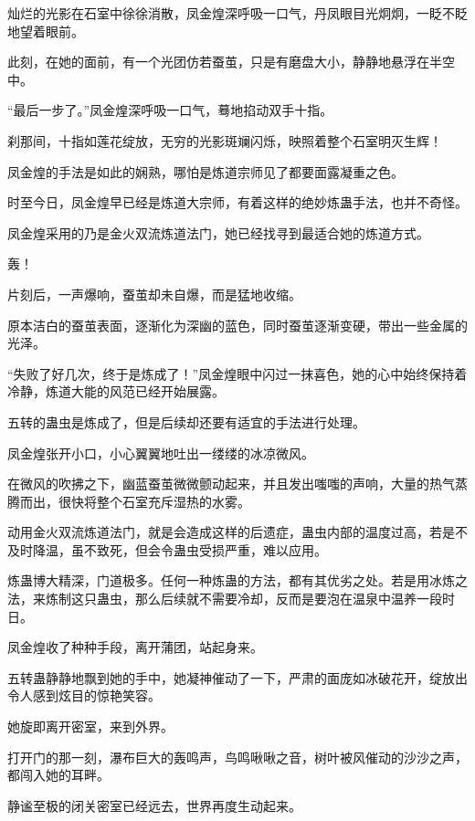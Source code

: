 
\begin{this_body}



灿烂的光影在石室中徐徐消散，凤金煌深呼吸一口气，丹凤眼目光炯炯，一眨不眨地望着眼前。

此刻，在她的面前，有一个光团仿若蚕茧，只是有磨盘大小，静静地悬浮在半空中。

“最后一步了。”凤金煌深呼吸一口气，蓦地掐动双手十指。

刹那间，十指如莲花绽放，无穷的光影斑斓闪烁，映照着整个石室明灭生辉！

凤金煌的手法是如此的娴熟，哪怕是炼道宗师见了都要面露凝重之色。

时至今日，凤金煌早已经是炼道大宗师，有着这样的绝妙炼蛊手法，也并不奇怪。

凤金煌采用的乃是金火双流炼道法门，她已经找寻到最适合她的炼道方式。

轰！

片刻后，一声爆响，蚕茧却未自爆，而是猛地收缩。

原本洁白的蚕茧表面，逐渐化为深幽的蓝色，同时蚕茧逐渐变硬，带出一些金属的光泽。

“失败了好几次，终于是炼成了！”凤金煌眼中闪过一抹喜色，她的心中始终保持着冷静，炼道大能的风范已经开始展露。

五转的蛊虫是炼成了，但是后续却还要有适宜的手法进行处理。

凤金煌张开小口，小心翼翼地吐出一缕缕的冰凉微风。

在微风的吹拂之下，幽蓝蚕茧微微颤动起来，并且发出嗤嗤的声响，大量的热气蒸腾而出，很快将整个石室充斥湿热的水雾。

动用金火双流炼道法门，就是会造成这样的后遗症，蛊虫内部的温度过高，若是不及时降温，虽不致死，但会令蛊虫受损严重，难以应用。

炼蛊博大精深，门道极多。任何一种炼蛊的方法，都有其优劣之处。若是用冰炼之法，来炼制这只蛊虫，那么后续就不需要冷却，反而是要泡在温泉中温养一段时日。

凤金煌收了种种手段，离开蒲团，站起身来。

五转蛊静静地飘到她的手中，她凝神催动了一下，严肃的面庞如冰破花开，绽放出令人感到炫目的惊艳笑容。

她旋即离开密室，来到外界。

打开门的那一刻，瀑布巨大的轰鸣声，鸟鸣啾啾之音，树叶被风催动的沙沙之声，都闯入她的耳畔。

静谧至极的闭关密室已经远去，世界再度生动起来。


\end{this_body}
